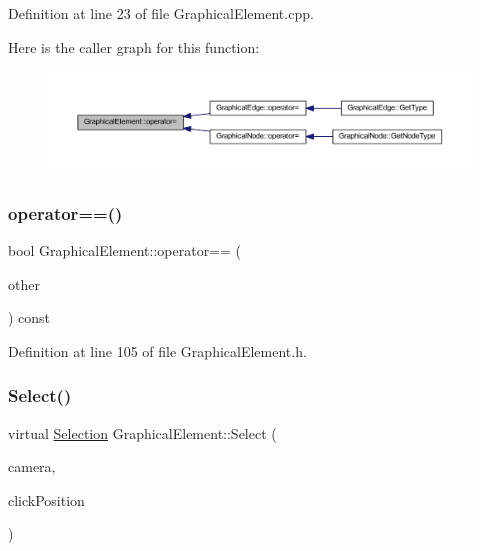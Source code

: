 Definition at line 23 of file Graphical\+Element.\+cpp.

Here is the caller graph for this function\+:
\nopagebreak
\begin{figure}[H]
\begin{center}
\leavevmode
\includegraphics[width=350pt]{class_graphical_element_add7f7f8fe319b3d966ffe3e756ef7b2e_icgraph}
\end{center}
\end{figure}
\mbox{\label{class_graphical_element_a4bbe253b3e4455a4084de813cf2235a8}} 
\subsubsection{\texorpdfstring{operator==()}{operator==()}}
{\footnotesize\ttfamily bool Graphical\+Element\+::operator== (\begin{DoxyParamCaption}\item[{const \hyperlink{class_graphical_element}{Graphical\+Element} \&}]{other }\end{DoxyParamCaption}) const\hspace{0.3cm}{\ttfamily [inline]}}



Definition at line 105 of file Graphical\+Element.\+h.

\mbox{\label{class_graphical_element_a2627b34e57829f942aa00720d9cc8b46}} 
\subsubsection{\texorpdfstring{Select()}{Select()}}
{\footnotesize\ttfamily virtual \hyperlink{struct_selection}{Selection} Graphical\+Element\+::\+Select (\begin{DoxyParamCaption}\item[{const wx\+Affine\+Matrix2D \&}]{camera,  }\item[{wx\+Point2\+D\+Double}]{click\+Position }\end{DoxyParamCaption})\hspace{0.3cm}{\ttfamily [pure virtual]}}



